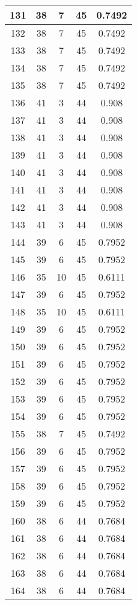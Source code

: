 \documentclass[letterpaper, 12pt]{article}
\begin{document}
\begin{longtable}{|c|c|c|c|c|}
\hline
131 & 38 & 7 & 45 & 0.7492 \\
\hline
132 & 38 & 7 & 45 & 0.7492 \\
\hline
133 & 38 & 7 & 45 & 0.7492 \\
\hline
134 & 38 & 7 & 45 & 0.7492 \\
\hline
135 & 38 & 7 & 45 & 0.7492 \\
\hline
136 & 41 & 3 & 44 & 0.908 \\
\hline
137 & 41 & 3 & 44 & 0.908 \\
\hline
138 & 41 & 3 & 44 & 0.908 \\
\hline
139 & 41 & 3 & 44 & 0.908 \\
\hline
140 & 41 & 3 & 44 & 0.908 \\
\hline
141 & 41 & 3 & 44 & 0.908 \\
\hline
142 & 41 & 3 & 44 & 0.908 \\
\hline
143 & 41 & 3 & 44 & 0.908 \\
\hline
144 & 39 & 6 & 45 & 0.7952 \\
\hline
145 & 39 & 6 & 45 & 0.7952 \\
\hline
146 & 35 & 10 & 45 & 0.6111 \\
\hline
147 & 39 & 6 & 45 & 0.7952 \\
\hline
148 & 35 & 10 & 45 & 0.6111 \\
\hline
149 & 39 & 6 & 45 & 0.7952 \\
\hline
150 & 39 & 6 & 45 & 0.7952 \\
\hline
151 & 39 & 6 & 45 & 0.7952 \\
\hline
152 & 39 & 6 & 45 & 0.7952 \\
\hline
153 & 39 & 6 & 45 & 0.7952 \\
\hline
154 & 39 & 6 & 45 & 0.7952 \\
\hline
155 & 38 & 7 & 45 & 0.7492 \\
\hline
156 & 39 & 6 & 45 & 0.7952 \\
\hline
157 & 39 & 6 & 45 & 0.7952 \\
\hline
158 & 39 & 6 & 45 & 0.7952 \\
\hline
159 & 39 & 6 & 45 & 0.7952 \\
\hline
160 & 38 & 6 & 44 & 0.7684 \\
\hline
161 & 38 & 6 & 44 & 0.7684 \\
\hline
162 & 38 & 6 & 44 & 0.7684 \\
\hline
163 & 38 & 6 & 44 & 0.7684 \\
\hline
164 & 38 & 6 & 44 & 0.7684 \\

\end{longtable}
\end{document}
